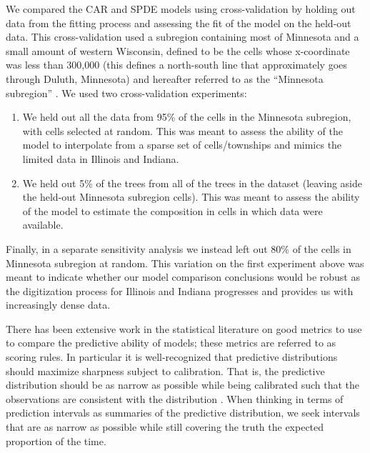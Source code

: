 \documentclass[12pt]{article}\usepackage[]{graphicx}\usepackage[]{color}
\begin{document}
We compared the CAR and SPDE models using cross-validation by holding
out data from the fitting process and assessing the fit of the model
on the held-out data. This cross-validation used a subregion containing
most of Minnesota and a small amount of western Wisconsin, defined
to be the cells whose x-coordinate was less than 300,000 (this defines
a north-south line that approximately goes through Duluth, Minnesota)
and hereafter referred to as the ``Minnesota subregion'' . We used
two cross-validation experiments:
\begin{enumerate}
\item We held out all the data from 95\% of the cells in the Minnesota subregion,
with cells selected at random. This was meant to assess the ability
of the model to interpolate from a sparse set of cells/townships and
mimics the limited data in Illinois and Indiana.
\item We held out 5\% of the trees from all of the trees in the dataset
(leaving aside the held-out Minnesota subregion cells). This was meant
to assess the ability of the model to estimate the composition in
cells in which data were available. 
\end{enumerate}
Finally, in a separate sensitivity analysis we instead left out 80\%
of the cells in Minnesota subregion at random. This variation on the
first experiment above was meant to indicate whether our model comparison
conclusions would be robust as the digitization process for Illinois
and Indiana progresses and provides us with increasingly dense data. 

There has been extensive work in the statistical literature on good
metrics to use to compare the predictive ability of models; these
metrics are referred to as scoring rules. In particular it is well-recognized
that predictive distributions should maximize sharpness subject to
calibration. That is, the predictive distribution should be as narrow
as possible while being calibrated such that the observations are
consistent with the distribution \citep{Gnei:etal:2007}. When thinking
in terms of prediction intervals as summaries of the predictive distribution,
we seek intervals that are as narrow as possible while still covering
the truth the expected proportion of the time. 
\end{document}
